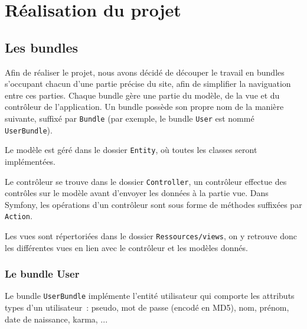 
\chapter{Réalisation du projet}

\section{Les bundles}

Afin de réaliser le projet, nous avons décidé de découper le travail en bundles s'occupant chacun d'une partie précise du site, afin de simplifier la naviguation entre ces parties.
Chaque bundle gère une partie du modèle, de la vue et du contrôleur de l'application. Un bundle possède son propre nom de la manière suivante, suffixé par \verb|Bundle| (par exemple, le bundle \verb|User| est nommé \verb|UserBundle|).

Le modèle est géré dans le dossier \verb|Entity|, où toutes les classes seront implémentées.

Le contrôleur se trouve dans le dossier \verb|Controller|, un contrôleur effectue des contrôles sur le modèle avant d'envoyer les données à la partie vue.
Dans Symfony, les opérations d'un contrôleur sont sous forme de méthodes suffixées par \verb|Action|.

Les vues sont répertoriées dans le dossier \verb|Ressources/views|, on y retrouve donc les différentes vues en lien avec le contrôleur et les modèles donnés.


\subsection{Le bundle User}

Le bundle \verb|UserBundle| implémente l'entité utilisateur qui comporte les attributs types d'un utilisateur~: pseudo, mot de passe (encodé en MD5), nom, prénom, date de naissance, karma, ...

